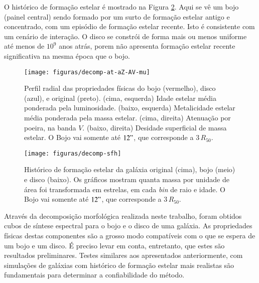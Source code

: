 O histórico de formação estelar é mostrado na Figura \ref{fig:decompSynSfh}.
Aqui se vê um bojo (painel central) sendo formado por um surto de formação
estelar antigo e concentrado, com um episódio de formação estelar recente. Isto
é consistente com um cenário de interação. O disco se constrói de forma mais ou
menos uniforme até menos de $10^9$ anos atrás, porem não apresenta formação
estelar recente significativa na mesma época que o bojo.

\begin{figure}
	\texttt{[image: figuras/decomp-at-aZ-AV-mu]}
	\caption[Perfil radial das propriedades do bojo, disco, e total] {Perfil
	radial das propriedades físicas do bojo (vermelho), disco (azul), e original
	(preto). (cima, esquerda) Idade estelar média ponderada pela luminosidade.
	(baixo, esquerda) Metalicidade estelar média ponderada pela massa estelar.
	(cima, direita) Atenuação por poeira, na banda $V$. (baixo, direita) Desidade
	superficial de massa estelar. O Bojo vai somente até $12"$, que corresponde a
	$3\,R_{50}$.}
	\label{fig:decompSynRadprof}
\end{figure}

\begin{figure}
	\texttt{[image: figuras/decomp-sfh]}
	\caption[Histórico de formação estelar do bojo, disco, e total] {Histórico de
	formação estelar da galáxia original (cima), bojo (meio) e disco (baixo). Os
	gráficos mostram quanta massa por unidade de área foi transformada em estrelas,
	em cada {\em bin} de raio e idade. O Bojo vai somente até $12"$, que
	corresponde a $3\,R_{50}$.}
	\label{fig:decompSynSfh}
\end{figure}

Através da decomposição morfológica realizada neste trabalho, foram obtidos
cubos de síntese espectral para o bojo e o disco de uma galáxia. As propriedades
físicas destas componentes são a grosso modo compatíveis com o que se espera de
um bojo e um disco. É preciso levar em conta, entretanto, que estes são resultados
preliminares. Testes similares aos apresentados anteriormente, com simulações de
galáxias com histórico de formação estelar mais realistas são fundamentais para
determinar a confiabilidade do método.


